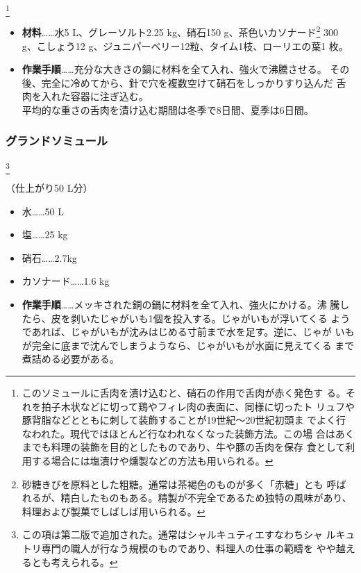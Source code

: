 \begin{recette}
\footnote{このソミュールに舌肉を漬け込むと、硝石の作用で舌肉が赤く発色す
  る。それを拍子木状などに切って鶏やフィレ肉の表面に、同様に切ったト
  リュフや豚背脂などとともに刺して装飾することが19世紀〜20世紀初頭ま
  でよく行なわれた。現代ではほとんど行なわれなくなった装飾方法。この場
  合はあくまでも料理の装飾を目的としたものであり、牛や豚の舌肉を保存
  食として利用する場合には塩漬けや燻製などの方法も用いられる。}


\begin{itemize}
\item
  \textbf{材料}\ldots{}\ldots{}水5 L、グレーソルト2.25 kg、硝石150
  g、茶色いカソナード\footnote{砂糖きびを原料とした粗糖。通常は茶褐色のものが多く「赤糖」とも
    呼ばれるが、精白したものもある。精製が不完全であるため独特の風味があり、
    料理および製菓でしばしば用いられる。} 300 g、こしょう12
  g、ジュニパーベリー12粒、タイム1枝、ローリエの葉1 枚。
\item
  \textbf{作業手順}\ldots{}\ldots{}充分な大きさの鍋に材料を全て入れ、強火で沸騰させる。
  その後、完全に冷めてから、針で穴を複数空けて硝石をしっかりすり込んだ
  舌肉を入れた容器に注ぎ込む。\\
  平均的な重さの舌肉を漬け込む期間は冬季で8日間、夏季は6日間。
\end{itemize}

\hypertarget{grande-saumure}{%
\subsubsection{グランドソミュール}\label{grande-saumure}}

\footnote{この項は第二版で追加された。通常はシャルキュティエすなわちシャ
  ルキュトリ専門の職人が行なう規模のものであり、料理人の仕事の範疇を
  やや越えるとも考えられる。}


（仕上がり50 L分）

\begin{itemize}
\tightlist
\item
  水\ldots{}\ldots{}50 L
\item
  塩\ldots{}\ldots{}25 kg
\item
  硝石\ldots{}\ldots{}2.7kg
\item
  カソナード\ldots{}\ldots{}1.6 kg
\item
  \textbf{作業手順}\ldots{}\ldots{}メッキされた銅の鍋に材料を全て入れ、強火にかける。沸
  騰したら、皮を剥いたじゃがいも1個を投入する。じゃがいもが浮いてくる
  ようであれば、じゃがいもが沈みはじめる寸前まで水を足す。逆に、じゃが
  いもが完全に底まで沈んでしまうようなら、じゃがいもが水面に見えてくる
  まで煮詰める必要がある。
\end{itemize}


\end{recette}
